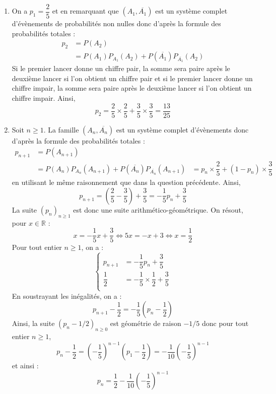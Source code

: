 \documentclass[a4paper,10pt]{report}
\begin{document}
\begin{enumerate}
\item On a $p_1= \dfrac{2}{5}$ et en remarquant que $(A_1, \overline{A_1})$ est un système complet d'évènements de probabilités non nulles donc d'après la formule des probabilités totales :
\begin{align*}
p_2  & = P(A_2) \\
& = P(A_1)P_{A_1}(A_2) + P(\overline{A_1})P_{\overline{A_1}}(A_2) 
\end{align*}
Si le premier lancer donne un chiffre pair, la somme sera paire après le deuxième lancer si l'on obtient un chiffre pair et si le premier  lancer donne un chiffre impair, la somme sera paire après le deuxième lancer si l'on obtient un chiffre impair. Ainsi,
$$ p_2 = \dfrac{2}{5} \times \dfrac{2}{5} + \dfrac{3}{5} \times \dfrac{3}{5}  = \dfrac{13}{25}$$
\item Soit $n \geq 1$. La famille $(A_n, \overline{A_n})$ est un système complet d'évènements  donc d'après la formule des probabilités totales :
\begin{align*}
p_{n+1}  & = P(A_{n+1}) \\
& = P(A_n)P_{A_n}(A_{n+1}) + P(\overline{A_n})P_{\overline{A_n}}(A_{n+1}) 
& = p_n \times \dfrac{2}{5} + (1-p_n) \times \dfrac{3}{5}
\end{align*}
en utilisant le même raisonnement que dans la question précédente. Ainsi,
$$ p_{n+1} = \left( \dfrac{2}{5} - \dfrac{3}{5} \right) + \dfrac{3}{5} = - \dfrac{1}{5} p_n + \dfrac{3}{5}$$
La suite $(p_n)_{n \geq 1}$ est donc une suite arithmético-géométrique. On résout, pour $x \in \mathbb{R}$ :
$$ x = - \dfrac{1}{5} x + \dfrac{3}{5} \Longleftrightarrow 5x=-x+3 \Longleftrightarrow x= \dfrac{1}{2}$$
Pour tout entier $n \geq 1$, on a :
$$ \left\lbrace \begin{array}{cl}
p_{n+1} & =  - \dfrac{1}{5} p_n + \dfrac{3}{5} \\[0.3cm]
\dfrac{1}{2} & =  - \dfrac{1}{5} \times \dfrac{1}{2}+ \dfrac{3}{5} \\
\end{array}\right.$$
En soustrayant les inégalités, on a :
$$ p_{n+1} - \dfrac{1}{2} = - \dfrac{1}{5} \left( p_n - \dfrac{1}{2} \right) $$
Ainsi, la suite $(p_n-1/2)_{n \geq 0}$ est géométrie de raison $-1/5$ donc pour tout entier $n \geq 1$,
$$ p_n - \dfrac{1}{2} = \left( - \dfrac{1}{5} \right)^{n-1} \left(p_1 - \dfrac{1}{2} \right) = - \dfrac{1}{10}  \left( - \dfrac{1}{5} \right)^{n-1}$$
et ainsi :
$$ p_n = \dfrac{1}{2} - \dfrac{1}{10}  \left( - \dfrac{1}{5} \right)^{n-1}$$
\end{enumerate}
\end{document}
